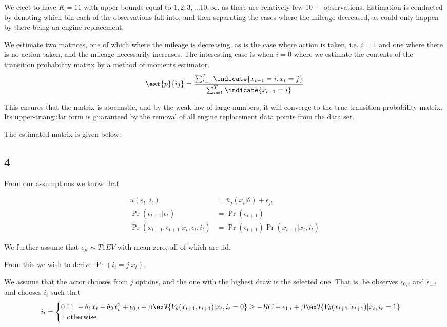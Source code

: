 \documentclass{paper}
\begin{document}
\vspace{.3in}

We elect to have $K = 11$ with upper bounds equal to $1,2,3,...10,\infty$,
as there are relatively few $10+$ observations. Estimation is
conducted by denoting which bin each of the observations fall into,
and then separating the cases where the mileage decreased, as could
only happen by there being an engine replacement.

We estimate two matrices, one of which where the mileage is
decreasing, as is the case where action is taken, i.e. $i=1$ and one
where there is no action taken, and the mileage necessarily
increases.  The interesting case is when $i = 0$ where we
estimate the contents of the transition probability matrix by a method
of moments estimator.
\begin{equation*}
  \est{p}{ij} = \frac{\sum_{t=1}^T \indicate{x_{t-1} = i, x_t =
      j}}{\sum_{t=1}^{T} \indicate{x_{t-1} = i}}
\end{equation*}

This ensures that the matrix is stochastic, and by the weak law of
large numbers, it will converge to the true transition probability
matrix. Its upper-triangular form is guaranteed by the removal of all
engine replacement data points from the data set.


The estimated matrix is given below:


\subsection{4}

From our assumptions we know that

\begin{align*}
  u(s_t, i_t) &= \bar{u}_{j}(x_t \vert \theta) + \epsilon_{jt}\\
  \Pr( \epsilon_{t+1} \vert \epsilon_t) &= \Pr( \epsilon_{t+1})\\
  \Pr( x_{t+1}, \epsilon_{t+1} \vert x_t, \epsilon_t, i_t) &= \Pr( \epsilon_{t+1}) \Pr( x_{t+1}
                                           \vert x_t, i_t)
\end{align*}

We further assume that $\epsilon_{jt} \sim T1EV$ with mean zero, all of which
are iid. 

From this we wish to derive $\Pr( i_t = j \vert x_t)$. 

We assume that the actor chooses from $j$ options, and the one with
the highest draw is the selected one. That is, he observes $\epsilon_{0,t}$
and $\epsilon_{1,t}$ and chooses $i_t$ such that
\begin{equation*}
  i_t =
  \begin{cases}
    0 \text{ if: } -\theta_1 x_t - \theta_2 x_t^2 + \epsilon_{0,t} + \beta
    \exV{V_{\theta}(x_{t+1},\epsilon_{t+1}) \vert x_t, i_t = 0} \geq -RC + \epsilon_{1,t} + \beta
    \exV{V_{\theta}(x_{t+1},\epsilon_{t+1}) \vert x_t, i_t = 1}\\
    1 \text{ otherwise}
  \end{cases}
\end{equation*}
\end{document}
